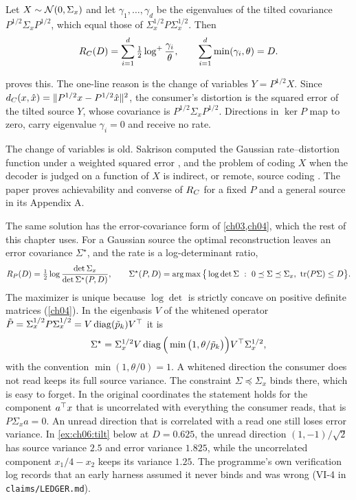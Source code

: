 \begin{proposition}\label{prop:ch06:gaussRD}
Let $X\sim\mathcal{N}(0,\Sigma_x)$ and let $\gamma_1,\dots,\gamma_d$ be the eigenvalues of the tilted covariance $P^{1/2}\Sigma_x P^{1/2}$, which equal those of $\Sigma_x^{1/2}P\Sigma_x^{1/2}$. Then
\begin{equation}\label{eq:ch06:gaussRD}
R_C(D)=\sum_{i=1}^d\tfrac12\log^+\frac{\gamma_i}{\theta},\qquad \sum_{i=1}^d\min(\gamma_i,\theta)=D .
\end{equation}
\end{proposition}

 proves this. The one-line reason is the change of variables $Y=P^{1/2}X$. Since $d_C(x,\hat x)=\lVert P^{1/2}x-P^{1/2}\hat x\rVert^2$, the consumer's distortion is the squared error of the tilted source $Y$, whose covariance is $P^{1/2}\Sigma_xP^{1/2}$. Directions in $\ker P$ map to zero, carry eigenvalue $\gamma_i=0$ and receive no rate.

The change of variables is old. Sakrison computed the Gaussian rate--distortion function under a weighted squared error \cite{sakrison1968}, and the problem of coding $X$ when the decoder is judged on a function of $X$ is indirect, or remote, source coding \cite{dobrushin1962,wolfziv1970,witsenhausen1980}. The paper proves achievability and converse of $R_C$ for a fixed $P$ and a general source in its Appendix A.

The same solution has the error-covariance form of \cref{ch03,ch04}, which the rest of this chapter uses. For a Gaussian source the optimal reconstruction leaves an error covariance $\Sigma^\star$, and the rate is a log-determinant ratio,
\begin{equation}\label{eq:ch06:maxdet}
R_P(D)=\tfrac12\log\frac{\det\Sigma_x}{\det\Sigma^\star(P,D)},\qquad
\Sigma^\star(P,D)=\argmax\big\{\log\det\Sigma\ :\ 0\preceq\Sigma\preceq\Sigma_x,\ \tr(P\Sigma)\le D\big\}.
\end{equation}
The maximizer is unique because $\log\det$ is strictly concave on positive definite matrices (\cref{ch04}). In the eigenbasis $V$ of the whitened operator $\tilde P=\Sigma_x^{1/2}P\Sigma_x^{1/2}=V\operatorname{diag}(\tilde p_k)V^{\top}$ it is
\begin{equation}\label{eq:ch06:sigmastar}
\Sigma^\star=\Sigma_x^{1/2}V\operatorname{diag}\Big(\min\big(1,\theta/\tilde p_k\big)\Big)V^{\top}\Sigma_x^{1/2},
\end{equation}
with the convention $\min(1,\theta/0)=1$. A whitened direction the consumer does not read keeps its full source variance. The constraint $\Sigma\preceq\Sigma_x$ binds there, which is easy to forget. In the original coordinates the statement holds for the component $a^{\top} x$ that is uncorrelated with everything the consumer reads, that is $P\Sigma_xa=0$. An unread direction that is correlated with a read one still loses error variance. In \cref{ex:ch06:tilt} below at $D=0.625$, the unread direction $(1,-1)/\sqrt2$ has source variance $2.5$ and error variance $1.825$, while the uncorrelated component $x_1/4-x_2$ keeps its variance $1.25$. The programme's own verification log records that an early harness assumed it never binds and was wrong (VI-4 in \texttt{claims/\allowbreak LEDGER.md}).

